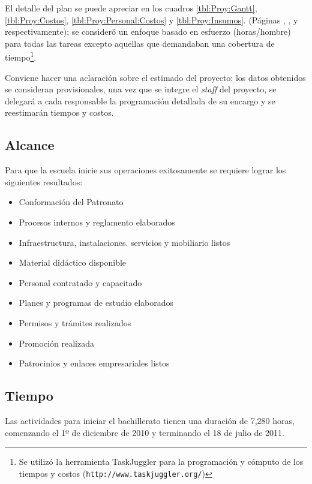 El detalle del plan se puede apreciar en los cuadros \ref{tbl:Proy:Gantt}, \ref{tbl:Proy:Costos}, \ref{tbl:Proy:Personal:Costos} y \ref{tbl:Proy:Insumos}. (Páginas \pageref{tbl:Proy:Gantt}, \pageref{tbl:Proy:Costos}, \pageref{tbl:Proy:Personal:Costos} y \pageref{tbl:Proy:Insumos} respectivamente); se consideró un enfoque basado en esfuerzo (horas/hombre) para todas las tareas excepto aquellas que demandaban una cobertura de tiempo\footnote{Se utilizó la herramienta TaskJuggler para la programación y cómputo de los tiempos y costos (\texttt{http://www.taskjuggler.org/})}.

Conviene hacer una aclaración sobre el estimado del proyecto: los datos obtenidos se consideran provisionales, una vez que se integre el \emph{staff} del proyecto, se delegará a cada responsable la programación detallada de su encargo y se reestimarán tiempos y costos.\label{sec:Proy:Aclaracion}

\subsection{Alcance}

Para que la escuela inicie sus operaciones exitosamente se requiere lograr los siguientes resultados:

\begin{itemize}
	\item Conformación del Patronato
	\item Procesos internos y reglamento elaborados
	\item Infraestructura, instalaciones. servicios y mobiliario listos
	\item Material didáctico disponible
	\item Personal contratado y capacitado
	\item Planes y programas de estudio elaborados
	\item Permisos y trámites realizados
	\item Promoción realizada
	\item Patrocinios y enlaces empresariales listos
\end{itemize}

\subsection{Tiempo}

Las actividades para iniciar el bachillerato tienen una duración de 7,280 horas, comenzando el 1º de diciembre de 2010 y terminando el 18 de julio  de 2011.

